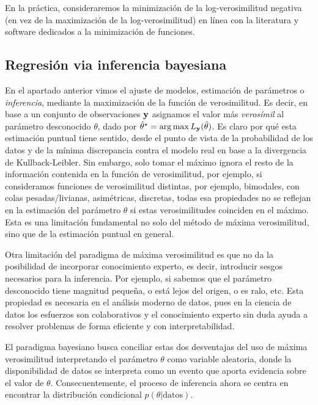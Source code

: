 En la práctica, consideraremos la minimización de la log-verosimilitud negativa (en vez de la maximización de la log-verosimilitud) en línea con la literatura y software dedicados a la minimización de funciones. 

\subsection{Regresión via inferencia bayesiana} 
\label{sub:inferencia_bayes}

En el apartado anterior vimos el ajuste de modelos, estimación de parámetros o \emph{inferencia}, mediante la maximización de la función de verosimilitud. Es decir, en base a un conjunto de observaciones $\mathbf{y}$ asignamos el valor más \emph{verosímil} al parámetro desconocido $\theta$, dado por $\hat\theta^\star = \arg\max  L_{\mathbf{y}}(\hat\theta)$. Es claro por qué esta estimación puntual tiene sentido, desde el punto de vista de la probabilidad de los datos y de la mínima discrepancia contra el modelo real en base a la  divergencia de Kullback-Leibler. Sin embargo, solo tomar el máximo ignora el resto de la información contenida en la función de verosimilitud, por ejemplo, si consideramos funciones de verosimilitud distintas, por ejemplo, bimodales, con colas pesadas/livianas, asimétricas, discretas, todas esa propiedades no se reflejan en la estimación del parámetro $\theta$ si  estas verosimilitudes coinciden en el máximo. Esta es una limitación fundamental no solo del método de máxima verosimilitud, sino que de la estimación puntual en general. 

Otra limitación del paradigma de máxima verosimilitud es que no da la posibilidad de incorporar conocimiento experto, es decir, introducir sesgos necesarios para la inferencia. Por ejemplo, si sabemos que el parámetro desconocido tiene magnitud pequeña, o está lejos del origen, o es ralo, etc. Esta propiedad es necesaria en el análisis moderno de datos, pues en la ciencia de datos los esfuerzos son colaborativos y el conocimiento experto sin duda ayuda a resolver problemas de forma eficiente y con interpretabilidad. 

El paradigma bayesiano busca conciliar estas dos desventajas del uso de máxima verosimilitud interpretando el parámetro $\theta$ como variable aleatoria, donde la disponibilidad de datos se interpreta como un evento que aporta evidencia sobre el valor de $\theta$. Consecuentemente, el proceso de inferencia ahora se centra en encontrar la distribución condicional  $p(\theta|\text{datos})$.



